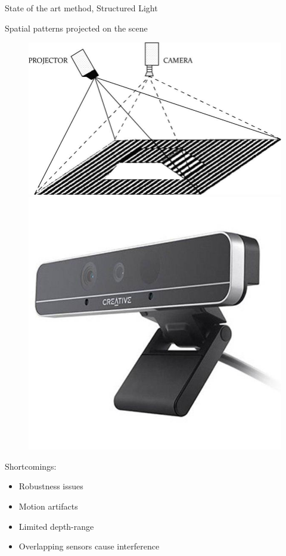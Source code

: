 \begin{frame}{State of the art method, Structured Light}

Spatial patterns projected on the scene
\begin{figure}
\includegraphics[scale=0.1]{pictures/polop4}
\includegraphics[scale=0.1]{pictures/polop3}
\end{figure}
Shortcomings:
\begin{itemize}
\item Robustness issues
\item Motion artifacts
\item Limited depth-range
\item Overlapping sensors cause interference
\end{itemize}
\end{frame}



